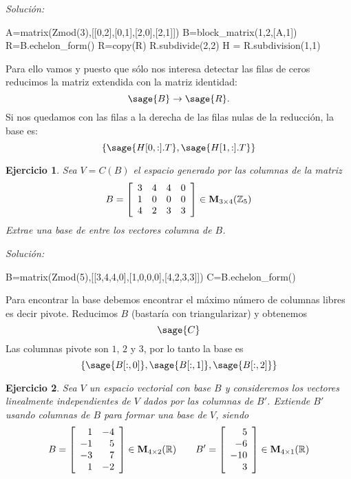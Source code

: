 \documentclass{amsart}
\newtheorem{ejer}{Ejercicio}
\begin{document}
{\it Soluci\'on:}
\begin{sageblock}
A=matrix(Zmod(3),[[0,2],[0,1],[2,0],[2,1]])
B=block_matrix(1,2,[A,1])
R=B.echelon_form()
R=copy(R)
R.subdivide(2,2)
H = R.subdivision(1,1)
\end{sageblock}
Para ello vamos y puesto que sólo nos interesa detectar las filas de ceros 
reducimos la matriz extendida con la matriz identidad: 
$$\sage{B} \to \sage{R}. $$
Si nos quedamos con las filas a la derecha de las filas nulas de la reducción, 
la base es:
\[ \left\lbrace \sage{H[0,:].T}, \sage{H[1,:].T}  \right\rbrace   \] 



\begin{ejer} Sea $V = C(B)$ el espacio generado por las columnas de la matriz
\[ B = \left[\begin{array}{rrrr}
3 & 4 & 4 & 0 \\
1 & 0 & 0 & 0 \\
4 & 2 & 3 & 3 
\end{array}\right] \in {\bf M}_{3 \times 4}({\mathbb Z}_{5})\] Extrae una base de entre los vectores columna de $B$.
\end{ejer}
{\it Soluci\'on:}
\begin{sageblock}
B=matrix(Zmod(5),[[3,4,4,0],[1,0,0,0],[4,2,3,3]])
C=B.echelon_form()
\end{sageblock}
Para encontrar la base debemos encontrar el máximo número de columnas libres es 
decir pivote. Reducimos $B$ (bastaría con triangularizar) y obtenemos
\[ \sage{C} \] Las columnas pivote son $1$, $2$ y $3$, por lo tanto la base es
\[ \left\lbrace \sage{B[:,0]}, \sage{B[:,1]}, \sage{B[:,2]}  \right\rbrace \] 


\begin{ejer} Sea $V$ un espacio vectorial con base $B$ y consideremos los 
vectores linealmente independientes de $V$ dados por las columnas de $B'$.
Extiende $B'$ usando columnas de $B$ para formar una base de $V$, siendo 
\[B = \left[\begin{array}{rr}
1 & -4 \\
-1 & 5 \\
-3 & 7 \\
1 & -2
\end{array}\right] \in {\bf M}_{4 \times 2}({\mathbb R}) \qquad
B' = \left[\begin{array}{r}
5 \\
-6 \\
-10 \\
3
\end{array}\right] \in {\bf M}_{4 \times 1}({\mathbb R}) \]
\end{ejer}
\end{document}
